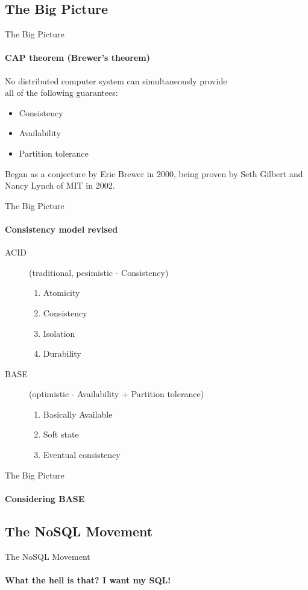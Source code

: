 \documentclass{beamer}
\begin{document}
\subsection{The Big Picture}
\begin{frame}{The Big Picture}
  \framesubtitle{CAP theorem (Brewer's theorem)}
  No distributed computer system can simultaneously provide\\all of
  the following guarantees:
  \begin{itemize}
    \item Consistency
    \item Availability
    \item Partition tolerance
  \end{itemize}
  \begin{center}
  \end{center}
  \fontsize{6}{8}\selectfont
  Began as a conjecture by Eric Brewer in 2000, being proven by Seth Gilbert
  and Nancy Lynch of MIT in 2002.\\
\end{frame}

\begin{frame}{The Big Picture}
  \framesubtitle{Consistency model revised}
  \begin{description}
    \item[ACID] (traditional, pesimistic - Consistency) \hfill
    \begin{enumerate}
      \item Atomicity
      \item Consistency
      \item Isolation
      \item Durability
    \end{enumerate}
    \item[BASE] (optimistic - Availability + Partition tolerance) \hfill
    \begin{enumerate}
      \item Basically Available
      \item Soft state
      \item Eventual consistency
    \end{enumerate}
  \end{description} 
\end{frame}

\begin{frame}{The Big Picture}
  \framesubtitle{Considering BASE}
\end{frame}

\subsection{The NoSQL Movement}
\begin{frame}{The NoSQL Movement}
  \framesubtitle{What the hell is that? I want my SQL!}
\end{frame}
\end{document}

